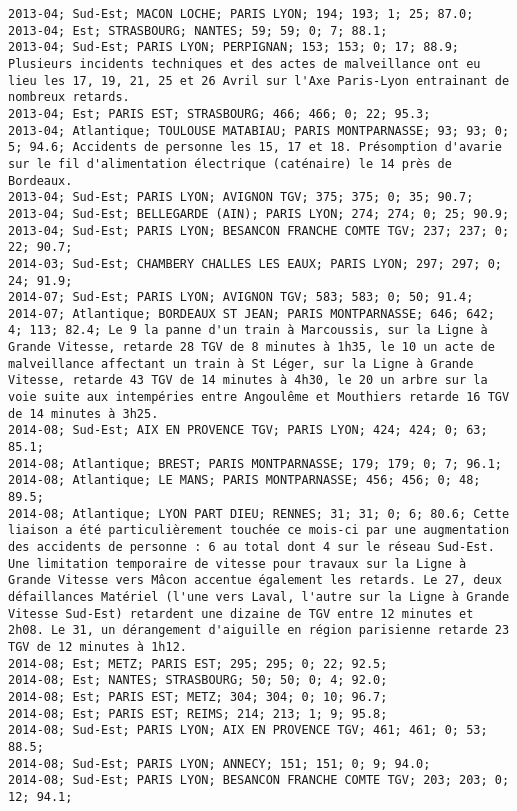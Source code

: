\documentclass{article}
\begin{document}
\begin{Verbatim}[commandchars=\\\{\}]
2013-04; Sud-Est; MACON LOCHE; PARIS LYON; 194; 193; 1; 25; 87.0; 
2013-04; Est; STRASBOURG; NANTES; 59; 59; 0; 7; 88.1; 
2013-04; Sud-Est; PARIS LYON; PERPIGNAN; 153; 153; 0; 17; 88.9; Plusieurs incidents techniques et des actes de malveillance ont eu lieu les 17, 19, 21, 25 et 26 Avril sur l'Axe Paris-Lyon entrainant de nombreux retards.
2013-04; Est; PARIS EST; STRASBOURG; 466; 466; 0; 22; 95.3; 
2013-04; Atlantique; TOULOUSE MATABIAU; PARIS MONTPARNASSE; 93; 93; 0; 5; 94.6; Accidents de personne les 15, 17 et 18. Présomption d'avarie sur le fil d'alimentation électrique (caténaire) le 14 près de Bordeaux.
2013-04; Sud-Est; PARIS LYON; AVIGNON TGV; 375; 375; 0; 35; 90.7; 
2013-04; Sud-Est; BELLEGARDE (AIN); PARIS LYON; 274; 274; 0; 25; 90.9; 
2013-04; Sud-Est; PARIS LYON; BESANCON FRANCHE COMTE TGV; 237; 237; 0; 22; 90.7; 
2014-03; Sud-Est; CHAMBERY CHALLES LES EAUX; PARIS LYON; 297; 297; 0; 24; 91.9; 
2014-07; Sud-Est; PARIS LYON; AVIGNON TGV; 583; 583; 0; 50; 91.4; 
2014-07; Atlantique; BORDEAUX ST JEAN; PARIS MONTPARNASSE; 646; 642; 4; 113; 82.4; Le 9 la panne d'un train à Marcoussis, sur la Ligne à Grande Vitesse, retarde 28 TGV de 8 minutes à 1h35, le 10 un acte de malveillance affectant un train à St Léger, sur la Ligne à Grande Vitesse, retarde 43 TGV de 14 minutes à 4h30, le 20 un arbre sur la voie suite aux intempéries entre Angoulême et Mouthiers retarde 16 TGV de 14 minutes à 3h25.
2014-08; Sud-Est; AIX EN PROVENCE TGV; PARIS LYON; 424; 424; 0; 63; 85.1; 
2014-08; Atlantique; BREST; PARIS MONTPARNASSE; 179; 179; 0; 7; 96.1; 
2014-08; Atlantique; LE MANS; PARIS MONTPARNASSE; 456; 456; 0; 48; 89.5; 
2014-08; Atlantique; LYON PART DIEU; RENNES; 31; 31; 0; 6; 80.6; Cette liaison a été particulièrement touchée ce mois-ci par une augmentation des accidents de personne : 6 au total dont 4 sur le réseau Sud-Est. Une limitation temporaire de vitesse pour travaux sur la Ligne à Grande Vitesse vers Mâcon accentue également les retards. Le 27, deux défaillances Matériel (l'une vers Laval, l'autre sur la Ligne à Grande Vitesse Sud-Est) retardent une dizaine de TGV entre 12 minutes et 2h08. Le 31, un dérangement d'aiguille en région parisienne retarde 23 TGV de 12 minutes à 1h12.
2014-08; Est; METZ; PARIS EST; 295; 295; 0; 22; 92.5; 
2014-08; Est; NANTES; STRASBOURG; 50; 50; 0; 4; 92.0; 
2014-08; Est; PARIS EST; METZ; 304; 304; 0; 10; 96.7; 
2014-08; Est; PARIS EST; REIMS; 214; 213; 1; 9; 95.8; 
2014-08; Sud-Est; PARIS LYON; AIX EN PROVENCE TGV; 461; 461; 0; 53; 88.5; 
2014-08; Sud-Est; PARIS LYON; ANNECY; 151; 151; 0; 9; 94.0; 
2014-08; Sud-Est; PARIS LYON; BESANCON FRANCHE COMTE TGV; 203; 203; 0; 12; 94.1; 

\end{Verbatim}
\end{document}
